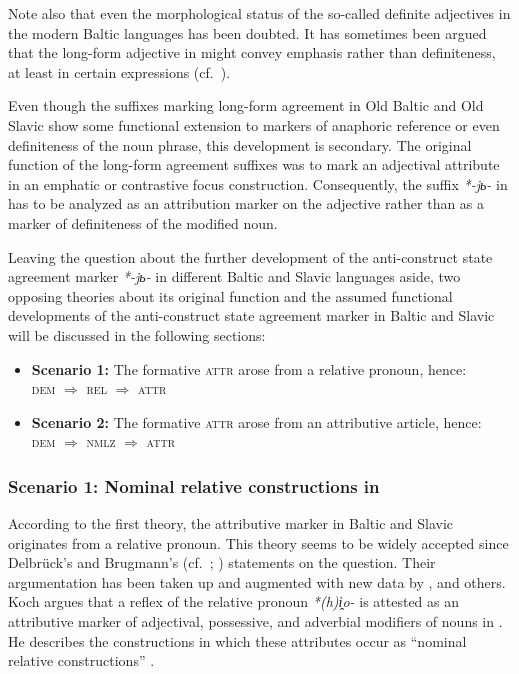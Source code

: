 Note also that even the morphological status of the so-called definite adjectives in the modern Baltic languages has been doubted. It has sometimes been argued that the long-form adjective in  might convey emphasis rather than definiteness, at least in certain expressions (cf.~\citealt[181–182]{kramsky1972}).

Even though the suffixes marking long-form agreement in Old Baltic and Old Slavic show some functional extension to markers of anaphoric reference or even definiteness of the noun phrase, this development is secondary. The original function of the long-form agreement suffixes was to mark an adjectival attribute in an emphatic or contrastive focus construction. Consequently, the suffix \textit{*-jь-} in  has to be analyzed as an attribution marker on the adjective rather than as a marker of definiteness of the modified noun.

Leaving the question about the further development of the anti\hyp{}construct state agreement marker \textit{*-jь-} in different Baltic and Slavic languages aside, two opposing theories about its original function and the assumed functional developments of the anti\hyp{}construct state agreement marker in Baltic and Slavic will be discussed in the following sections:
\begin{itemize}
\item \textbf{Scenario 1:} The formative \textsc{attr} arose from a relative pronoun, hence:\\
\textsc{dem $\Rightarrow$ rel $\Rightarrow$ attr}
\item \textbf{Scenario 2:} The formative \textsc{attr} arose from an attributive article, hence:\\
\textsc{dem $\Rightarrow$ nmlz $\Rightarrow$ attr}
\label{2paths}
\end{itemize}

\subsubsection{Scenario 1: Nominal relative constructions in }
According to the first theory, the attributive marker in Baltic and Slavic originates from a relative pronoun. This theory seems to be widely accepted since Delbrück's and Brugmann's (cf.~\citealt[432–433]{delbruck1893}; \citealt[331, 344]{brugmann-etal1916}) statements on the question. Their argumentation has been taken up and augmented with new data by \citet{schmidt1959}, \citet{koch1992,koch1999} and others. Koch argues that a reflex of the  relative pronoun \textit{*(h)i̭o-} is attested as an attributive marker of adjectival, possessive, and adverbial modifiers of nouns in . He describes the constructions in which these attributes occur as “nominal relative constructions” \cite[470, passim]{koch1999}.

